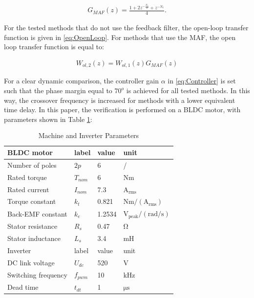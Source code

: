\documentclass[conference]{IEEEtran}
\begin{document}
\begin{equation}
\begin{aligned}
G_{MAF}(z) = \frac{1 + 2z^{-\frac{N_c}{2}} + z^{-N_c}}{4}.
\label{eq:MAF} 
\end{aligned}    
\end{equation}

For the tested methods that do not use the feedback filter, the open-loop transfer function is given in \eqref{eq:OpenLoop}. For methods that use the MAF, the open loop transfer function is equal to:

\begin{equation}
\begin{aligned}
W_{ol,2}(z) = W_{ol,1}(z) G_{MAF}(z)
\label{eq:OpenLoop_MAF} 
\end{aligned}    
\end{equation}

For a clear dynamic comparison, the controller gain $\alpha$ in \eqref{eq:Controller} is set such that the phase margin equal to $70^o$ is achieved for all tested methods. In this way, the crossover frequency is increased for methods with a lower equivalent time delay. 
In this paper, the verification is performed on a BLDC motor, with parameters shown in Table \ref{tab:motor_param}:

\begin{table}[h!]
			  \caption{Machine and Inverter Parameters}
              \label{tab:motor_param}
              \centering
              \begin{tabular}{llll}
                           \midrule\midrule
        BLDC motor & label & value   & unit\\
        \midrule               
                  Number of poles	& $2p$ & 6 & /\\
                  Rated torque  & $T_{nom}$ & 6 &  $\mathrm{Nm}$  \\
                  Rated current  & $I_{nom}$ & 7.3 &  $\mathrm{A_{rms}}$  \\
                  Torque constant  & $k_{t}$ & 0.821 & $\mathrm{Nm/(A_{rms})}$   \\
                  Back-EMF constant  & $k_{e}$ & 1.2534 & $\mathrm{V_{peak}/(rad/s)}$   \\
                  Stator resistance  & $R_{s}$ & 0.47 & $\mathrm{\Omega}$   \\
                  Stator inductance  & $L_{s}$ & 3.4 & mH   \\
                  \midrule\midrule

        Inverter & label & value   & unit\\
        \midrule               
                  DC link voltage	& $U_{dc}$ & 520 & V \\  
                  Switching frequency  & $f_{pwm}$ & 10 & kHz   \\
                  Dead time  & $t_{dt}$ & 1 &  $\mathrm{\mu s}$  \\
                  \midrule\midrule
                                                        
              \end{tabular}
\end{table}
\end{document}
